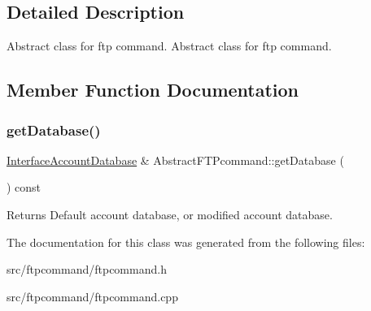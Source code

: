 \subsection{Detailed Description}
Abstract class for ftp command.  Abstract class for ftp command. 

\subsection{Member Function Documentation}
\mbox{\label{classAbstractFTPcommand_a22bac678c35be37939d485fb866f759e}} 
\subsubsection{\texorpdfstring{get\+Database()}{getDatabase()}}
{\footnotesize\ttfamily \hyperlink{classInterfaceAccountDatabase}{Interface\+Account\+Database} \& Abstract\+F\+T\+Pcommand\+::get\+Database (\begin{DoxyParamCaption}{ }\end{DoxyParamCaption}) const\hspace{0.3cm}{\ttfamily [protected]}}

\begin{DoxyReturn}{Returns}
Default account database, or modified account database. 
\end{DoxyReturn}


The documentation for this class was generated from the following files\+:\begin{DoxyCompactItemize}
\item 
src/ftpcommand/ftpcommand.\+h\item 
src/ftpcommand/ftpcommand.\+cpp\end{DoxyCompactItemize}
